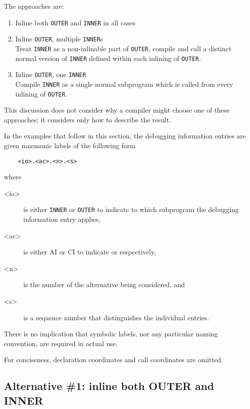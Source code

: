 The approaches are:
\begin{enumerate}[1. ]
\item  Inline both \texttt{OUTER} and \texttt{INNER} in all cases

\item Inline \texttt{OUTER}, multiple \texttt{INNER}s \\
Treat \texttt{INNER} as a non-inlinable part of \texttt{OUTER}, compile and
call a distinct normal version of \texttt{INNER} defined within each
inlining of \texttt{OUTER}.

\item Inline \texttt{OUTER}, one \texttt{INNER} \\
Compile \texttt{INNER} as a single normal subprogram which is called
from every inlining of \texttt{OUTER}.
\end{enumerate}

This discussion does not consider why a compiler might choose
one of these approaches; it considers only how to describe
the result.

In the examples that follow in this section, the debugging
information entries are given mnemonic labels of the following
form
\begin{verbatim}
    <io>.<ac>.<n>.<s>
\end{verbatim}
where
\begin{description}
\item[\textless io\textgreater]
is either \texttt{INNER} or \texttt{OUTER} to indicate to which
subprogram the debugging information entry applies, 
\item[\textless ac\textgreater]
is either AI or CI to indicate  or
 respectively, 
\item[\textless n\textgreater]
is the number of the
alternative being considered, and 
\item[\textless s\textgreater]
is a sequence number that
distinguishes the individual entries. 
\end{description}
There is no implication
that symbolic labels, nor any particular naming convention,
are required in actual use.

For conciseness, declaration coordinates and call coordinates are omitted.

\subsection{Alternative \#1: inline both OUTER and INNER}
\label{app:inlinebothouterandinner}

